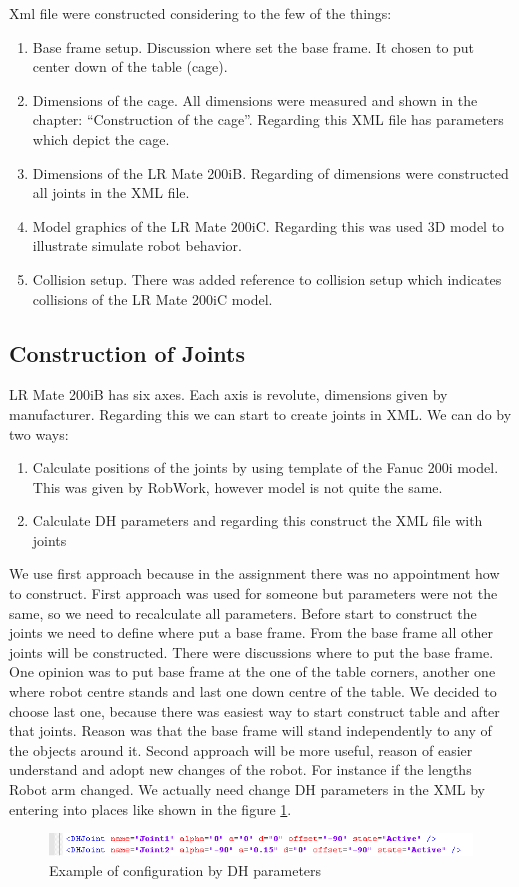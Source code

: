 Xml file were constructed considering to the few of the things:
\begin{enumerate}
\item Base frame setup. Discussion where set the base frame. It chosen to put center down of the table (cage).
\item Dimensions of the cage. All dimensions were measured and shown in the chapter: “Construction of the cage”. Regarding this XML file has parameters which depict the cage.
\item Dimensions of the LR Mate 200iB. Regarding of dimensions were constructed all joints in the XML file.
\item Model graphics of the LR Mate 200iC. Regarding this was used 3D model to illustrate simulate robot behavior.
\item Collision setup. There was added reference to collision setup which indicates collisions of the LR Mate 200iC model.
\end{enumerate} 

\subsection{Construction of Joints}
LR Mate 200iB has six axes. Each axis is revolute, dimensions given by manufacturer. Regarding this we can start to create joints in XML. We can do by two ways:
\begin{enumerate}
\item Calculate positions of the joints by using template of the Fanuc 200i model. This was given by RobWork, however model is not quite the same.
\item Calculate DH parameters and regarding this construct the XML file with joints
\end{enumerate} 

We use first approach because in the assignment there was no appointment how to construct. First approach was used for someone but parameters were not the same, so we need to recalculate all parameters. Before start to construct the joints we need to define where put a base frame. From the base frame all other joints will be constructed. There were discussions where to put the base frame. One opinion was to put base frame at the one of the table corners, another one where robot centre stands and last one down centre of the table. We decided to choose last one, because there was easiest way to start construct table and after that joints. Reason was that the base frame will stand independently to any of the objects around it.
Second approach will be more useful, reason of easier understand and adopt new changes of the robot. For instance if the lengths Robot arm changed. We actually need change DH parameters in the XML by entering into places like shown in the figure \ref{fig:DHParameters}. 

\begin{figure}[H]
  \centering
  \includegraphics[scale= 0.65]{source/DHParameters.png}
  \caption{Example of configuration by DH parameters}
  \label{fig:DHParameters}
\end{figure}




